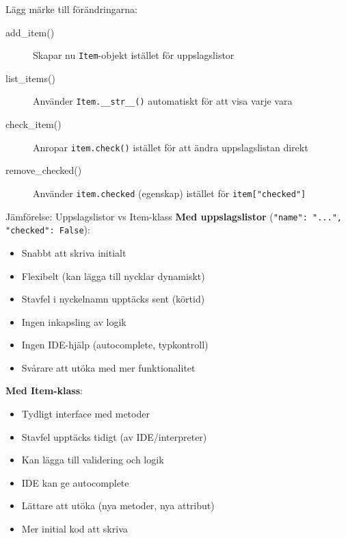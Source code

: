 Lägg märke till förändringarna:
\begin{description}
  \item[add\_item()] Skapar nu \texttt{Item}-objekt istället för
    uppslagslistor
  \item[list\_items()] Använder \texttt{Item.__str__()} automatiskt
    för att visa varje vara
  \item[check\_item()] Anropar \texttt{item.check()} istället för
    att ändra uppslagslistan direkt
  \item[remove\_checked()] Använder \texttt{item.checked}
    (egenskap) istället för \texttt{item["checked"]}
\end{description}

\begin{frame}
  \begin{block}{Jämförelse: Uppslagslistor vs Item-klass}
    \textbf{Med uppslagslistor} (\texttt{{"name": "...", "checked": False}}):
    \begin{itemize}
      \item[+] Snabbt att skriva initialt
      \item[+] Flexibelt (kan lägga till nycklar dynamiskt)
      \item[−] Stavfel i nyckelnamn upptäcks sent (körtid)
      \item[−] Ingen inkapsling av logik
      \item[−] Ingen IDE-hjälp (autocomplete, typkontroll)
      \item[−] Svårare att utöka med mer funktionalitet
    \end{itemize}

    \vspace{0.5em}

    \textbf{Med Item-klass}:
    \begin{itemize}
      \item[+] Tydligt interface med metoder
      \item[+] Stavfel upptäcks tidigt (av IDE/interpreter)
      \item[+] Kan lägga till validering och logik
      \item[+] IDE kan ge autocomplete
      \item[+] Lättare att utöka (nya metoder, nya attribut)
      \item[−] Mer initial kod att skriva
    \end{itemize}
  \end{block}
\end{frame}

